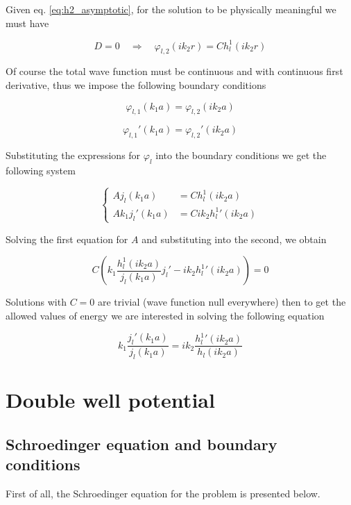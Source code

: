 \documentclass{article}
\begin{document}
Given eq. \eqref{eq:h2_asymptotic}, for the solution to be physically meaningful we must have

\begin{equation}
D = 0 \quad \Rightarrow \quad \varphi_{l,2}(ik_2r) = C h_l^1(ik_2r)
\end{equation}

Of course the total wave function must be continuous and with continuous first derivative, thus we impose the following boundary conditions

\begin{equation}
\varphi_{l,1}(k_1a) = \varphi_{l,2}(ik_2a)
\end{equation}

\begin{equation}
\varphi_{l,1}'(k_1a) = \varphi_{l,2}'(ik_2a)
\end{equation}

Substituting the expressions for \( \varphi_l \) into the boundary conditions we get the following system

\begin{equation}
  \begin{cases}
    A j_l(k_1a) & = C h_l^1(ik_2a) \\
    A k_1 j_l'(k_1a) & = C i k_2 {h_l^1}'(ik_2a)
  \end{cases}
\end{equation}

Solving the first equation for \( A \) and substituting into the second, we obtain

\begin{equation}
C \left( k_1 \frac{h_l^1(ik_2a)}{j_l(k_1a)} j_l' - i k_2 {h_l^1}'(ik_2a) \right) = 0
\end{equation}

Solutions with \( C = 0 \) are trivial (wave function null everywhere) then to get the allowed values of energy we are interested in solving the following equation

\begin{equation}
k_1 \frac{j_l'(k_1a)}{j_l(k_1a)} = i k_2 \frac{{h_l^1}'(ik_2a)}{h_l(ik_2a)}
\end{equation}

\section{Double well potential}

\subsection{Schroedinger equation and boundary conditions}
First of all, the Schroedinger equation for the problem is presented below.
\end{document}

